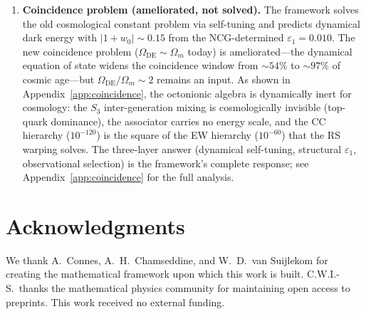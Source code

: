 \begin{enumerate}
  \item \textbf{Coincidence problem (ameliorated, not solved).}  The framework solves the old cosmological constant problem via self-tuning and predicts dynamical dark energy with $|1+w_0| \sim 0.15$ from the NCG-determined $\varepsilon_1 = 0.010$.  The new coincidence problem ($\Omega_{\mathrm{DE}} \sim \Omega_m$ today) is ameliorated---the dynamical equation of state widens the coincidence window from ${\sim}54\%$ to ${\sim}97\%$ of cosmic age---but $\Omega_{\mathrm{DE}}/\Omega_m \sim 2$ remains an input.  As shown in Appendix~\ref{app:coincidence}, the octonionic algebra is dynamically inert for cosmology: the $S_3$ inter-generation mixing is cosmologically invisible (top-quark dominance), the associator carries no energy scale, and the CC hierarchy ($10^{-120}$) is the square of the EW hierarchy ($10^{-60}$) that the RS warping solves.  The three-layer answer (dynamical self-tuning, structural $\varepsilon_1$, observational selection) is the framework's complete response; see Appendix~\ref{app:coincidence} for the full analysis.
\end{enumerate}


\section*{Acknowledgments}

We thank A.~Connes, A.~H.~Chamseddine, and W.~D.~van Suijlekom for creating the mathematical framework upon which this work is built. C.W.I.-S.\ thanks the mathematical physics community for maintaining open access to preprints. This work received no external funding.



